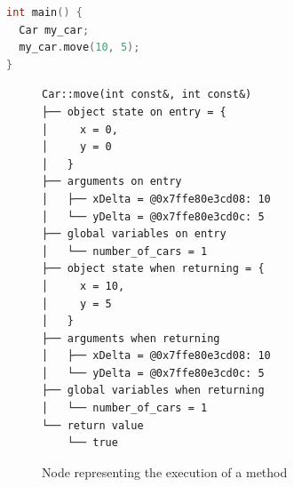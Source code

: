 \begin{definition}[Node]
\begin{exmp}
\begin{lstlisting}[style=interfaces, language=C++, caption=Car class, frame=tb, label={lst:carClass}]
int main() {
  Car my_car;
  my_car.move(10, 5);
}
\end{lstlisting}

\begin{figure}[ht]
\caption{Node representing the execution of a method}
\label{fig:carNode}
\begin{verbatim}
Car::move(int const&, int const&)                                   
├── object state on entry = {
│     x = 0,                                
│     y = 0                                                         
│   }                                                               
├── arguments on entry
│   ├── xDelta = @0x7ffe80e3cd08: 10                 
│   └── yDelta = @0x7ffe80e3cd0c: 5                                                                                                                  
├── global variables on entry                                                                                                                        
│   └── number_of_cars = 1                                                                                                                           
├── object state when returning = {                                                                                                                  
│     x = 10,                                                                                                                                        
│     y = 5                                                                                                                                          
│   }                                                                                                                                                
├── arguments when returning                                                                                                                         
│   ├── xDelta = @0x7ffe80e3cd08: 10                                                                                                                 
│   └── yDelta = @0x7ffe80e3cd0c: 5                                                                                                                  
├── global variables when returning                                                                                                                  
│   └── number_of_cars = 1                                                                                                                           
└── return value                                                                                                                                     
    └── true
\end{verbatim}
\end{figure}
\end{exmp}

\end{definition}
